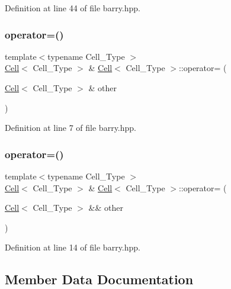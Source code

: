 Definition at line 44 of file barry.\+hpp.

\mbox{\label{classbarry_1_1_cell_a6cfdc588dba9ca10a11693d644ac0c60}} 
\subsubsection{\texorpdfstring{operator=()}{operator=()}\hspace{0.1cm}{\footnotesize\ttfamily [1/2]}}
{\footnotesize\ttfamily template$<$typename Cell\+\_\+\+Type $>$ \\
\hyperlink{classbarry_1_1_cell}{Cell}$<$ Cell\+\_\+\+Type $>$ \& \hyperlink{classbarry_1_1_cell}{Cell}$<$ Cell\+\_\+\+Type $>$\+::operator= (\begin{DoxyParamCaption}\item[{\hyperlink{classbarry_1_1_cell}{Cell}$<$ Cell\+\_\+\+Type $>$ \&}]{other }\end{DoxyParamCaption})}



Definition at line 7 of file barry.\+hpp.

\mbox{\label{classbarry_1_1_cell_a775ee69aabe8581d9fb2a3729d49a5df}} 
\subsubsection{\texorpdfstring{operator=()}{operator=()}\hspace{0.1cm}{\footnotesize\ttfamily [2/2]}}
{\footnotesize\ttfamily template$<$typename Cell\+\_\+\+Type $>$ \\
\hyperlink{classbarry_1_1_cell}{Cell}$<$ Cell\+\_\+\+Type $>$ \& \hyperlink{classbarry_1_1_cell}{Cell}$<$ Cell\+\_\+\+Type $>$\+::operator= (\begin{DoxyParamCaption}\item[{\hyperlink{classbarry_1_1_cell}{Cell}$<$ Cell\+\_\+\+Type $>$ \&\&}]{other }\end{DoxyParamCaption})}



Definition at line 14 of file barry.\+hpp.



\subsection{Member Data Documentation}
\mbox{\label{classbarry_1_1_cell_a52918ded332c6a12109b5962d6bf3ae9}} 
